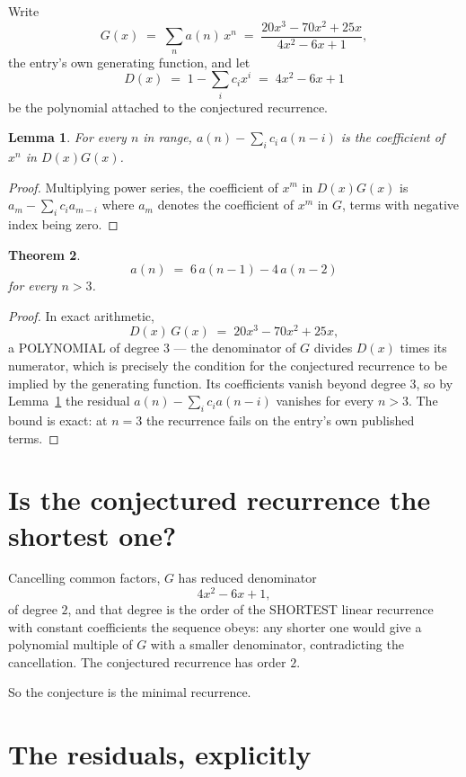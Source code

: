 \documentclass[11pt,a4paper]{article}
\theoremstyle{plain}
\newtheorem{theorem}{Theorem}
\newtheorem{lemma}[theorem]{Lemma}
\theoremstyle{definition}
\begin{document}
Write
\[
G(x)\;=\;\sum_{n}a(n)\,x^{n}\;=\;\frac{20 x^{3} - 70 x^{2} + 25 x}{4 x^{2} - 6 x + 1},
\]
the entry's own generating function, and let
\[
D(x)\;=\;1-\sum_i c_i x^{i}\;=\;4 x^{2} - 6 x + 1
\]
be the polynomial attached to the conjectured recurrence.

\begin{lemma}\label{lem:key}
For every $n$ in range, $a(n)-\sum_i c_i\,a(n-i)$ is the coefficient of $x^{n}$ in
$D(x)G(x)$.
\end{lemma}

\begin{proof}
Multiplying power series, the coefficient of $x^{m}$ in $D(x)G(x)$ is
$a_m-\sum_i c_i a_{m-i}$ where $a_m$ denotes the coefficient of $x^{m}$ in $G$, terms with
negative index being zero.
\end{proof}

\begin{theorem}
\[
a(n)\;=\;6\,a(n-1) - 4\,a(n-2)
\]
for every $n>3$.
\end{theorem}

\begin{proof}
In exact arithmetic,
\[
D(x)\,G(x)\;=\;20 x^{3} - 70 x^{2} + 25 x,
\]
a POLYNOMIAL of degree $3$ --- the denominator of $G$ divides $D(x)$ times its numerator,
which is precisely the condition for the conjectured recurrence to be implied by the
generating function. Its coefficients vanish beyond degree $3$, so by
Lemma~\ref{lem:key} the residual $a(n)-\sum_ic_ia(n-i)$ vanishes for every
$n>3$. The bound is exact: at $n=3$ the recurrence fails on the entry's own published terms.
\end{proof}

\section{Is the conjectured recurrence the shortest one?}

Cancelling common factors, $G$ has reduced denominator
\[
4 x^{2} - 6 x + 1,
\]
of degree $2$, and that degree is the order of the SHORTEST linear recurrence with
constant coefficients the sequence obeys: any shorter one would give a polynomial multiple of
$G$ with a smaller denominator, contradicting the cancellation. The conjectured recurrence has
order $2$.

So the conjecture is the minimal recurrence.

\section{The residuals, explicitly}
\end{document}
